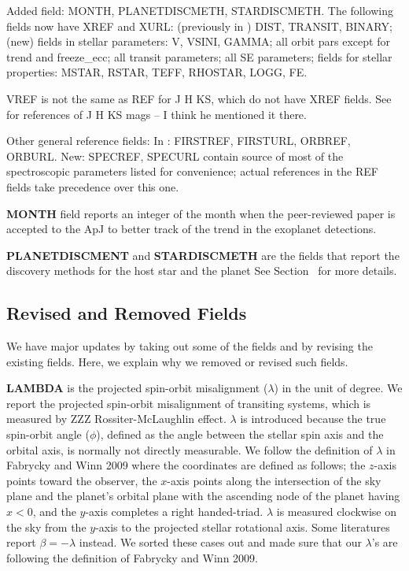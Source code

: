\documentclass[11pt,preprint]{aastex}
\begin{document}
\begin{CJK*}{UTF8}{gbsn}
Added field: MONTH, PLANETDISCMETH, STARDISCMETH.
The following fields now have XREF and XURL: (previously in
\cite{Wright2011}) DIST, TRANSIT, BINARY; (new) fields in stellar
parameters: V, VSINI, GAMMA; all orbit pars except for trend and
freeze\_ecc; all transit parameters; all SE parameters; fields for
stellar properties: MSTAR, RSTAR, TEFF, RHOSTAR, LOGG, FE. 

VREF is not the same as REF for J H KS, which do not have XREF
fields. See \cite{Wright2011} for references of J H KS mags -- I think
he mentioned it there.

Other general reference fields: In \cite{Wright2011}: FIRSTREF,
FIRSTURL, ORBREF, ORBURL. New: SPECREF, SPECURL contain source of most
of the spectroscopic parameters listed for convenience; actual
references in the REF fields take precedence over this one.

{\bf MONTH} field reports an integer of the month when the
peer-reviewed paper is accepted to the ApJ to better track of the
trend in the exoplanet detections.

{\bf PLANETDISCMENT} and {\bf STARDISCMETH} are the fields that report
the discovery methods for the host star and the planet See Section~
for more details.


\subsection{Revised and Removed Fields}
We have major updates by taking out some of the fields and by revising the existing fields. Here, we explain why we removed or revised such fields. 

{\bf LAMBDA} is the projected spin-orbit misalignment ($\lambda$) in
the unit of degree. We report the projected spin-orbit misalignment of
transiting systems, which is measured by ZZZ Rossiter-McLaughlin
effect. $\lambda$ is introduced because the true spin-orbit angle
($\phi$), defined as the angle between the stellar spin axis and the
orbital axis, is normally not directly measurable. We follow the
definition of $\lambda$ in Fabrycky and Winn 2009 where the
coordinates are defined as follows; the $z$-axis points toward the
observer, the $x$-axis points along the intersection of the sky plane
and the planet's orbital plane with the ascending node of the planet
having $x<0$, and the $y$-axis completes a right
handed-triad. $\lambda$ is measured clockwise on the sky from the
$y$-axis to the projected stellar rotational axis. Some literatures
report $\beta = -\lambda$ instead. We sorted these cases out and made
sure that our $\lambda$'s are following the definition of Fabrycky and
Winn 2009.


\end{CJK*}
\end{document}
